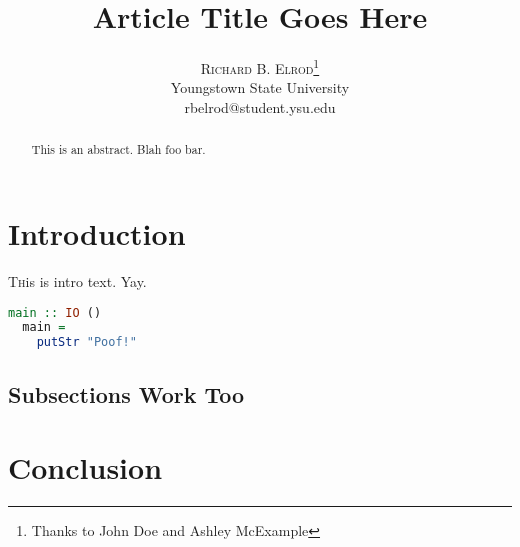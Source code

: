 \documentclass[twoside]{article}
\title{\vspace{-15mm}\fontsize{24pt}{10pt}\selectfont\textbf{Article Title Goes Here}}
\author{
\large
\textsc{Richard B. Elrod}\thanks{Thanks to John Doe and Ashley McExample}\\[2mm]
\normalsize Youngstown State University \\
\normalsize rbelrod@student.ysu.edu
\vspace{-5mm}
}
\date{}
\begin{document}
\maketitle

\begin{abstract}
\noindent This is an abstract. Blah foo bar.
\end{abstract}

\begin{multicols}{2}

\section{Introduction}
\lettrine[nindent=0em,lines=3]{T} his is intro text. Yay.

\begin{lstlisting}[caption=A code sample!,language=Haskell]
  main :: IO ()
  main =
    putStr "Poof!"
\end{lstlisting}\cite{FirstCitation}

\subsection{Subsections Work Too}

\section{Conclusion}




\end{multicols}

\listoftodos
\end{document}
